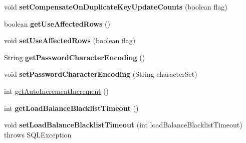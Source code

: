 \begin{DoxyCompactItemize}
\item 
\mbox{\label{classcom_1_1mysql_1_1jdbc_1_1jdbc2_1_1optional_1_1_connection_wrapper_ac2c292a170d4227df11443225b64e201}} 
void {\bfseries set\+Compensate\+On\+Duplicate\+Key\+Update\+Counts} (boolean flag)
\item 
\mbox{\label{classcom_1_1mysql_1_1jdbc_1_1jdbc2_1_1optional_1_1_connection_wrapper_a3f3a43ab1961c51e191816642ce68c8b}} 
boolean {\bfseries get\+Use\+Affected\+Rows} ()
\item 
\mbox{\label{classcom_1_1mysql_1_1jdbc_1_1jdbc2_1_1optional_1_1_connection_wrapper_abf2da9b16a4885a7a3f8f2d2a493d4ee}} 
void {\bfseries set\+Use\+Affected\+Rows} (boolean flag)
\item 
\mbox{\label{classcom_1_1mysql_1_1jdbc_1_1jdbc2_1_1optional_1_1_connection_wrapper_a75958f42daa7fea9989a4df895701dba}} 
String {\bfseries get\+Password\+Character\+Encoding} ()
\item 
\mbox{\label{classcom_1_1mysql_1_1jdbc_1_1jdbc2_1_1optional_1_1_connection_wrapper_a4da0976f3eba1731525126b481fb2516}} 
void {\bfseries set\+Password\+Character\+Encoding} (String character\+Set)
\item 
int \mbox{\hyperlink{classcom_1_1mysql_1_1jdbc_1_1jdbc2_1_1optional_1_1_connection_wrapper_aabd8b0c60542e830e0fccfc8ed0ab005}{get\+Auto\+Increment\+Increment}} ()
\item 
\mbox{\label{classcom_1_1mysql_1_1jdbc_1_1jdbc2_1_1optional_1_1_connection_wrapper_aad60e8ab40e026340d1a39ee0f29f9db}} 
int {\bfseries get\+Load\+Balance\+Blacklist\+Timeout} ()
\item 
\mbox{\label{classcom_1_1mysql_1_1jdbc_1_1jdbc2_1_1optional_1_1_connection_wrapper_a7505ecaeaf9ef5f1ec245a2942cbca63}} 
void {\bfseries set\+Load\+Balance\+Blacklist\+Timeout} (int load\+Balance\+Blacklist\+Timeout)  throws S\+Q\+L\+Exception 

\end{DoxyCompactItemize}
